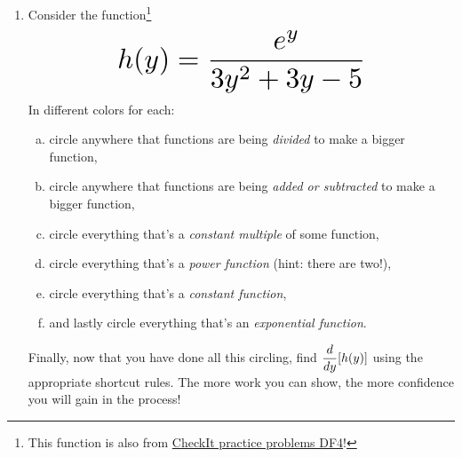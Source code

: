 \begin{enumerate}[leftmargin=15pt]
    \pagebreak

    \item Consider the function\footnote{This function is also from \href{https://library.tbil.org/2025/calculus/exercises/\#/bank/DF4/1/}{CheckIt practice problems DF4}!} 
    \[\scaleto{h(y) = \dfrac{e^y}{3y^2+3y-5}}{50 pt} \]
    In different colors for each:
    \begin{enumerate}[(a), leftmargin=15pt]
        \item circle anywhere that functions are being \textit{divided} to make a bigger function,
        \item circle anywhere that functions are being \textit{added or subtracted} to make a bigger function,
        \item circle everything that's a \textit{constant multiple} of some function,
        \item circle everything that's a \textit{power function} (hint: there are two!),
        \item circle everything that's a \textit{constant function},
        \item and lastly circle everything that's an \textit{exponential function}.
    \end{enumerate}
    Finally, now that you have done all this circling, find $\displaystyle\frac{d}{dy} [h(y)]$ using the appropriate shortcut rules. The more work you can show, the more confidence you will gain in the process!
    \vfill

\end{enumerate}


